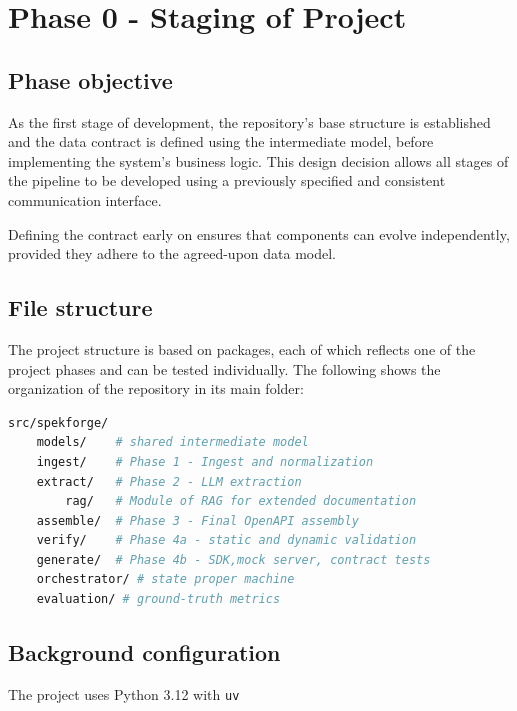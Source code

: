 \chapter{Phase 0 - Staging of Project}

\section{Phase objective}

As the first stage of development, the repository’s base structure 
is established and the data contract is defined using the 
intermediate model, before implementing the system’s business 
logic. This design decision allows all stages of the pipeline 
to be developed using a previously specified and consistent 
communication interface.

Defining the contract early on ensures that components can evolve 
independently, provided they adhere to the agreed-upon data model.

\section{File structure}
The project structure is based on packages, each of which reflects 
one of the project phases and can be tested individually.
The following shows the organization of the repository in its 
main folder:

\begin{lstlisting}[language=bash, caption={Structure of \texttt{src/spekforge}}]
src/spekforge/
    models/    # shared intermediate model
    ingest/    # Phase 1 - Ingest and normalization
    extract/   # Phase 2 - LLM extraction
        rag/   # Module of RAG for extended documentation
    assemble/  # Phase 3 - Final OpenAPI assembly
    verify/    # Phase 4a - static and dynamic validation
    generate/  # Phase 4b - SDK,mock server, contract tests
    orchestrator/ # state proper machine
    evaluation/ # ground-truth metrics   
\end{lstlisting}

\section{Background configuration}
The project uses Python 3.12 with \texttt{uv}

